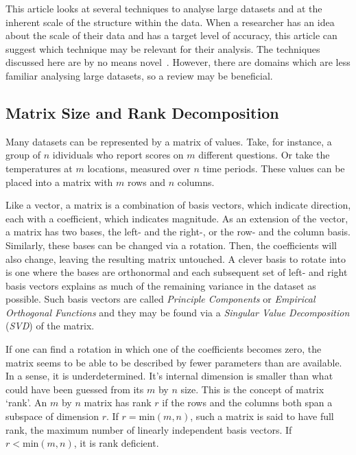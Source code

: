 \documentclass{acm_proc_article-sp}
\begin{document}
This article looks at several techniques to analyse large datasets and at the inherent scale of the structure within the data. When a researcher has an idea about the scale of their data and has a target level of accuracy, this article can suggest which technique may be relevant for their analysis. The techniques discussed here are by no means novel~\cite{Golub1970, Bjorck1973, Chan1982}. However, there are domains which are less familiar analysing large datasets, so a review may be beneficial.

\subsection{Matrix Size and Rank Decomposition}
\label{sec:Introduction Matrix Size and Rank Decomposition}

Many datasets can be represented by a matrix of values. Take, for instance, a group of $n$ idividuals who report scores on $m$ different questions. Or take the temperatures at $m$ locations, measured over $n$ time periods. These values can be placed into a matrix with $m$ rows and $n$ columns.

Like a vector, a matrix is a combination of basis vectors, which indicate direction, each with a coefficient, which indicates magnitude. As an extension of the vector, a matrix has two bases, the left- and the right-, or the row- and the column basis. Similarly, these bases can be changed via a rotation. Then, the coefficients will also change, leaving the resulting matrix untouched. A clever basis to rotate into is one where the bases are orthonormal and each subsequent set of left- and right basis vectors explains as much of the remaining variance in the dataset as possible. Such basis vectors are called \textit{Principle Components} or \textit{Empirical Orthogonal Functions} and they may be found via a \textit{Singular Value Decomposition} (\textit{SVD}) of the matrix.

If one can find a rotation in which one of the coefficients becomes zero, the matrix seems to be able to be described by fewer parameters than are available. In a sense, it is underdetermined. It's internal dimension is smaller than what could have been guessed from its $m$ by $n$ size. This is the concept of matrix `rank'. An $m$ by $n$ matrix has rank $r$ if the rows and the columns both span a subspace of dimension $r$. If $r = \text{min}(m, n)$, such a matrix is said to have full rank, the maximum number of linearly independent basis vectors. If $r < \text{min}(m, n)$, it is rank deficient.
\end{document}
